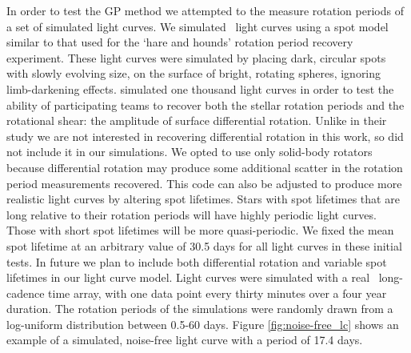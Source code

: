 In order to test the GP method we attempted to the measure rotation periods of
a set of simulated light curves.
We simulated \nlightcurves\ light curves using a spot model similar to that
used
for the \citet{Aigrain2015} `hare and hounds' rotation period recovery
experiment.
These light curves were simulated by placing dark, circular spots with slowly
evolving size, on the surface of bright, rotating spheres, ignoring
limb-darkening effects.
\citet{Aigrain2015} simulated one thousand light curves in order to test the
ability of participating teams to recover both the stellar rotation periods
and the rotational shear: the amplitude of surface differential rotation.
Unlike in their study we are not interested in recovering differential
rotation in this work, so did not include it in our simulations.
We opted to use only solid-body rotators because differential rotation may
produce some additional scatter in the rotation period measurements recovered.
This code can also be adjusted to produce more realistic light curves by
altering spot lifetimes.
Stars with spot lifetimes that are long relative to their rotation periods
will have highly periodic light curves.
Those with short spot lifetimes will be more quasi-periodic.
We fixed the mean spot lifetime at an arbitrary value of 30.5 days for all
light curves in these initial tests.
In future we plan to include both differential rotation and variable spot
lifetimes in our light curve model.
Light curves were simulated with a real \Kepler\ long-cadence time array, with
one data point every thirty minutes over a four year duration.
The rotation periods of the simulations were randomly drawn from a log-uniform
distribution between 0.5-60 days.
Figure \ref{fig:noise-free_lc} shows an example of a simulated, noise-free
light curve with a period of 17.4 days.


